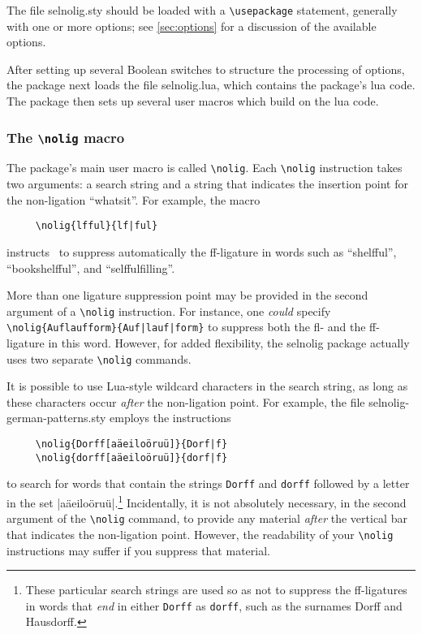 \documentclass[11pt]{article}
\newcommand{\pkg}[1]{\textsf{#1}}
\newcommand{\opt}[1]{\texttt{#1}}
\newcommand{\cmmd}[1]{\texttt{\textbackslash #1}}
\begin{document}
The file \pkg{selnolig.sty} should be loaded with a \cmmd{usepackage} statement, generally with one or more options; see \cref{sec:options} for a discussion of the available options. 

After setting up several Boolean switches to structure the processing of options, the package next loads the file \pkg{selnolig.lua}, which contains the package's lua code. The package then sets up several user macros which build on the lua code.

\subsubsection{The \cmmd{nolig} macro}
\label{sec:nolig}

The package's main user macro is called \cmmd{nolig}. Each \cmmd{nolig} instruction takes two arguments: a search string and a string that indicates the insertion point for the non-ligation \enquote{whatsit}. For example, the macro
\begin{Verbatim}
     \nolig{lfful}{lf|ful}
\end{Verbatim}
instructs \LuaLaTeX\ to suppress automatically the ff-ligature in words such as \enquote{shelfful}, \enquote{bookshelfful}, and \enquote{selffulfilling}. 

More than one ligature suppression point may be provided in the second argument of a \cmmd{nolig} instruction. For instance, one \emph{could} specify \Verb+\nolig{Auflaufform}{Auf|lauf|form}+ to suppress both the fl- and the ff-ligature in this word. However, for added flexibility, the \pkg{selnolig} package actually uses two separate \cmmd{nolig} commands.


It is possible to use Lua-style wildcard characters in the search string, as long as these characters occur \emph{after} the non-ligation point. For example, the file \pkg{selnolig-german-patterns.sty} employs the instructions 
\begin{Verbatim}
     \nolig{Dorff[aäeiloöruü]}{Dorf|f}
     \nolig{dorff[aäeiloöruü]}{dorf|f}
\end{Verbatim}
to search for words that contain the strings \opt{Dorff} and \opt{dorff} followed by a letter in the set |aäeiloöruü|.\footnote{These particular search strings are used so as not to suppress the ff-ligatures in words that \emph{end} in either \opt{Dorff} as \opt{dorff}, such as the surnames Dorff and Hausdorff.} Incidentally, it is not absolutely necessary, in the second argument of the \cmmd{nolig} command, to provide any material \emph{after} the vertical bar that indicates the non-ligation point. However, the readability of your \cmmd{nolig} instructions may suffer if you suppress that material.
\end{document}
